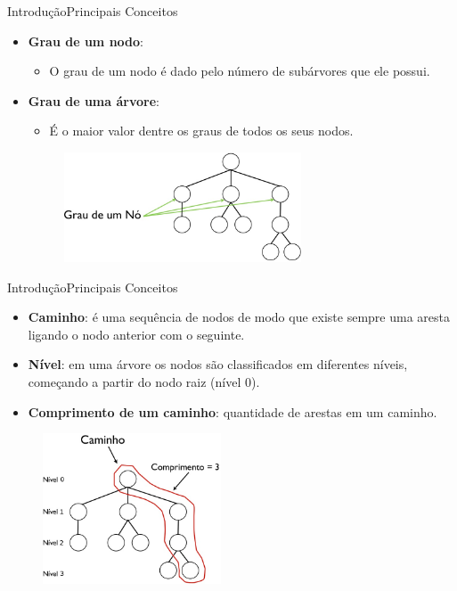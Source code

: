 \documentclass[aspectratio=169]{beamer}
\begin{document}
\begin{frame}{Introdução}{Principais Conceitos}
\begin{itemize}
 \item {\bf Grau de um nodo}:
 \begin{itemize}
  \item O grau de um nodo é dado pelo número de subárvores que ele possui.
 \end{itemize}
 \item {\bf Grau de uma árvore}:
 \begin{itemize}
  \item É o maior valor dentre os graus de todos os seus nodos.
 \end{itemize} 
 \begin{figure}[!h]
  \centering
   \includegraphics[width=200pt]{imagens/grau_arvore.png}
  \label{fig_grau_arvore}
\end{figure} 
\end{itemize}
\end{frame}

\begin{frame}{Introdução}{Principais Conceitos}
\begin{itemize}
 \item {\bf Caminho}: é uma sequência de nodos de modo que existe sempre uma aresta ligando o nodo anterior com o seguinte.
 \item {\bf Nível}: em uma árvore os nodos são classificados em diferentes níveis, começando a partir do nodo raiz (nível 0).
 \item {\bf Comprimento de um caminho}: quantidade de arestas em um caminho. 
\end{itemize}
 \begin{figure}[!h]
  \centering
   \includegraphics[width=150pt]{imagens/caminho.png}
  \label{fig_caminho}
\end{figure}
\end{frame}
\end{document}

